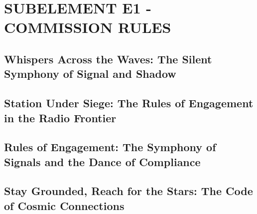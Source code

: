 \documentclass[12pt]{book}
\begin{document}
\tableofcontents
\newpage
\chapter{SUBELEMENT E1 - COMMISSION RULES}
\section{Whispers Across the Waves: The Silent Symphony of Signal and Shadow}











\section{Station Under Siege: The Rules of Engagement in the Radio Frontier}











\section{Rules of Engagement: The Symphony of Signals and the Dance of Compliance}












\section{Stay Grounded, Reach for the Stars: The Code of Cosmic Connections}












\end{document}
